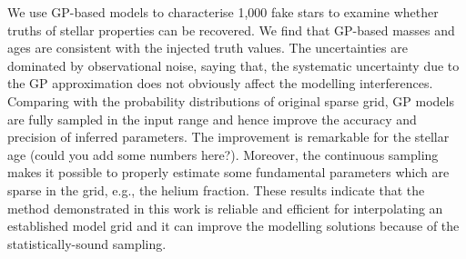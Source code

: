We use GP-based models to characterise 1,000 fake stars to examine whether truths of stellar properties can be recovered. We find that GP-based masses and ages are consistent with the injected truth values. The uncertainties are dominated by observational noise, saying that, the systematic uncertainty due to the GP approximation does not obviously affect the modelling interferences. Comparing with the probability distributions of original sparse grid, GP models are fully sampled in the input range and hence improve the accuracy and precision of inferred parameters. The improvement is remarkable for the stellar age (could you add some numbers here?). Moreover, the continuous sampling makes it possible to properly estimate some fundamental parameters which are sparse in the grid, e.g., the helium fraction. These results indicate that the method demonstrated in this work is reliable and efficient for interpolating an established model grid and it can improve the modelling solutions because of the statistically-sound sampling. 
